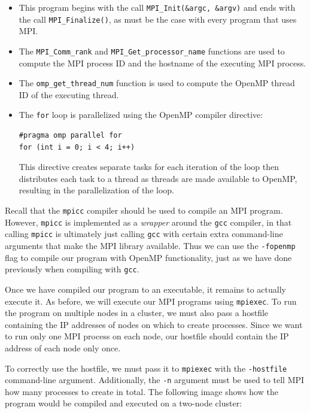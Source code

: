 \documentclass{article}
\theoremstyle{definition}
\begin{document}
\begin{itemize}
    \item This program begins with the call \texttt{MPI\_Init(\&argc, \&argv)} and ends with the call \texttt{MPI\_Finalize()}, as must be the case with every program that uses MPI.
    
    \item The \texttt{MPI\_Comm\_rank} and \texttt{MPI\_Get\_processor\_name} functions are used to compute the MPI process ID and the hostname of the executing MPI process.
    
    \item The \texttt{omp\_get\_thread\_num} function is used to compute the OpenMP thread ID of the executing thread.
    \pagebreak
    \item The \texttt{for} loop is parallelized using the OpenMP compiler directive:
    \begin{verbatim}
#pragma omp parallel for
for (int i = 0; i < 4; i++)\end{verbatim}
    This directive creates separate tasks for each iteration of the loop then distributes each task to a thread as threads are made available to OpenMP, resulting in the parallelization of the loop.
\end{itemize}

Recall that the \texttt{mpicc} compiler should be used to compile an MPI program. However, \texttt{mpicc} is implemented as a \emph{wrapper} around the \texttt{gcc} compiler, in that calling \texttt{mpicc} is ultimately just calling \texttt{gcc} with certain extra command-line arguments that make the MPI library available. Thus we can use the \texttt{-fopenmp} flag to compile our program with OpenMP functionality, just as we have done previously when compiling with \texttt{gcc}.

Once we have compiled our program to an executable, it remains to actually execute it. As before, we will execute our MPI programs using \texttt{mpiexec}. To run the program on multiple nodes in a cluster, we must also pass a hostfile containing the IP addresses of nodes on which to create processes. Since we want to run only one MPI process on each node, our hostfile should contain the IP address of each node only once. 

To correctly use the hostfile, we must pass it to \texttt{mpiexec} with the \texttt{-hostfile} command-line argument. Additionally, the \texttt{-n} argument must be used to tell MPI how many processes to create in total. The following image shows how the program would be compiled and executed on a two-node cluster:
\end{document}
